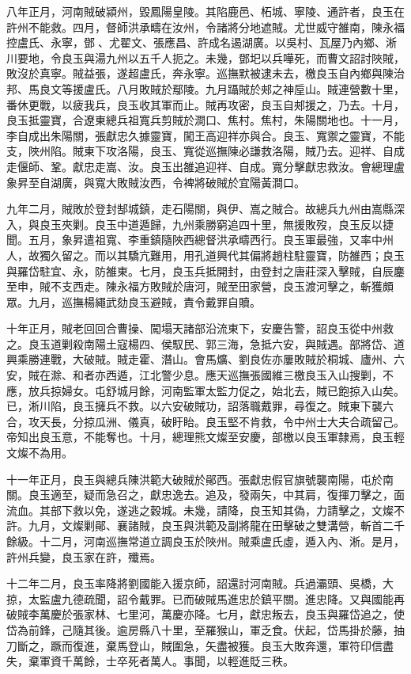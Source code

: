 \begin{pinyinscope}
八年正月，河南賊破潁州，毀鳳陽皇陵。其陷鹿邑、柘城、寧陵、通許者，良玉在許州不能救。四月，督師洪承疇在汝州，令諸將分地遮賊。尤世威守雒南，陳永福控盧氏、永寧，鄧、尤翟文、張應昌、許成名遏湖廣。以吳村、瓦屋乃內鄉、淅川要地，令良玉與湯九州以五千人扼之。未幾，鄧圯以兵嘩死，而曹文詔討陜賊，敗沒於真寧。賊益張，遂超盧氏，奔永寧。巡撫默被逮未去，檄良玉自內鄉與陳治邦、馬良文等援盧氏。八月敗賊於鄢陵。九月躡賊於郟之神垕山。賊連營數十里，番休更戰，以疲我兵，良玉收其軍而止。賊再攻密，良玉自郟援之，乃去。十月，良玉抵靈寶，合遼東總兵祖寬兵剪賊於澗口、焦村。焦村，朱陽關地也。十一月，李自成出朱陽關，張獻忠久據靈寶，闖王高迎祥亦與合。良玉、寬禦之靈寶，不能支，陜州陷。賊東下攻洛陽，良玉、寬從巡撫陳必謙救洛陽，賊乃去。迎祥、自成走偃師、鞏。獻忠走嵩、汝。良玉出雒追迎祥、自成。寬分擊獻忠救汝。會總理盧象昇至自湖廣，與寬大敗賊汝西，令裨將破賊於宜陽黃澗口。

九年二月，賊敗於登封郜城鎮，走石陽關，與伊、嵩之賊合。故總兵九州由嵩縣深入，與良玉夾剿。良玉中道遁歸，九州乘勝窮追四十里，無援敗歿，良玉反以捷聞。五月，象昇遣祖寬、李重鎮隨陜西總督洪承疇西行。良玉軍最強，又率中州人，故獨久留之。而以其驕亢難用，用孔道興代其偏將趙柱駐靈寶，防雒西；良玉與羅岱駐宜、永，防雒東。七月，良玉兵抵開封，由登封之唐莊深入擊賊，自辰鏖至申，賊不支西走。陳永福方敗賊於唐河，賊至田家營，良玉渡河擊之，斬獲頗眾。九月，巡撫楊繩武劾良玉避賊，責令戴罪自贖。

十年正月，賊老回回合曹操、闖塌天諸部沿流東下，安慶告警，詔良玉從中州救之。良玉道剿殺南陽土寇楊四、侯馭民、郭三海，急抵六安，與賊遇。部將岱、道興乘勝連戰，大破賊。賊走霍、潛山。會馬爌、劉良佐亦屢敗賊於桐城、廬州、六安，賊在滁、和者亦西遁，江北警少息。應天巡撫張國維三檄良玉入山搜剿，不應，放兵掠婦女。屯舒城月餘，河南監軍太監力促之，始北去，賊已飽掠入山矣。已，淅川陷，良玉擁兵不救。以六安破賊功，詔落職戴罪，尋復之。賊東下襲六合，攻天長，分掠瓜洲、儀真，破盱眙。良玉堅不肯救，令中州士大夫合疏留己。帝知出良玉意，不能奪也。十月，總理熊文燦至安慶，部檄以良玉軍隸焉，良玉輕文燦不為用。

十一年正月，良玉與總兵陳洪範大破賊於鄖西。張獻忠假官旗號襲南陽，屯於南關。良玉適至，疑而急召之，獻忠逸去。追及，發兩矢，中其肩，復揮刀擊之，面流血。其部下救以免，遂逃之穀城。未幾，請降，良玉知其偽，力請擊之，文燦不許。九月，文燦剿鄖、襄諸賊，良玉與洪範及副將龍在田擊破之雙溝營，斬首二千餘級。十二月，河南巡撫常道立調良玉於陜州。賊乘盧氏虛，遁入內、淅。是月，許州兵變，良玉家在許，殲焉。

十二年二月，良玉率降將劉國能入援京師，詔還討河南賊。兵過灞頭、吳橋，大掠，太監盧九德疏聞，詔令戴罪。已而破賊馬進忠於鎮平關。進忠降。又與國能再破賊李萬慶於張家林、七里河，萬慶亦降。七月，獻忠叛去，良玉與羅岱追之，使岱為前鋒，己隨其後。逾房縣八十里，至羅猴山，軍乏食。伏起，岱馬掛於藤，抽刀斷之，蹶而復進，棄馬登山，賊圍急，矢盡被獲。良玉大敗奔還，軍符印信盡失，棄軍資千萬餘，士卒死者萬人。事聞，以輕進貶三秩。


\end{pinyinscope}
